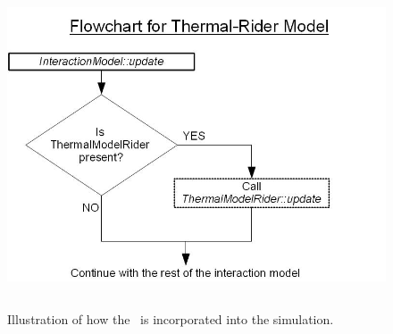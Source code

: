 \begin{figure}[htp]
\begin{center}
\includegraphics[height=3.8in]{figures/flow_chart_1.jpg}
\caption{Illustration of how the \ThermalRiderDesc\ is incorporated
into the simulation.}
\label{fig:thermalflowchart1}
\end{center}
\end{figure}

